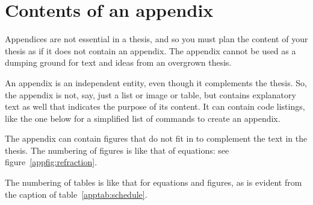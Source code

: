 \documentclass[english, 12pt, a4paper, sci, utf8, a-2b, online]{../definitions/aaltothesis}
\begin{document}
\clearpage

\thesisappendix

\section{Contents of an appendix}
\label{app:contents}

Appendices are not essential in a thesis, and so you must plan the content of 
your thesis as if it does not contain an appendix. The appendix cannot be used 
as a dumping ground for text and ideas from an overgrown thesis.

An appendix is an independent entity, even though it complements the thesis. 
So, the appendix is not, say, just a list or image or table, but contains 
explanatory text as well that indicates the purpose of its content. It can 
contain code listings, like the one below for a simplified list of commands to 
create an appendix.

The appendix can contain figures that do not fit in to complement the text in 
the thesis. The numbering of figures is like that of equations: see figure~\ref{appfig:refraction}.

The numbering of tables is like that for equations and figures, as is evident 
from the caption of table~\ref{apptab:schedule}.

\begin{table}[htb]
	\centering
	\caption{Caption for the table.}
	\label{apptab:schedule}
	\sffamily%
\end{table}
\end{document}
